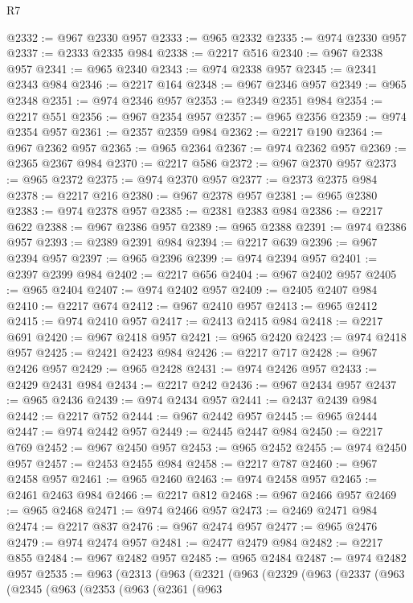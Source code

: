 \begin{lexlean}{R7}
\begin{coremodule}
@2332 := @967 @2330 @957
@2333 := @965 @2332
@2335 := @974 @2330 @957
@2337 := @2333 @2335 @984
@2338 := @2217 @516
@2340 := @967 @2338 @957
@2341 := @965 @2340
@2343 := @974 @2338 @957
@2345 := @2341 @2343 @984
@2346 := @2217 @164
@2348 := @967 @2346 @957
@2349 := @965 @2348
@2351 := @974 @2346 @957
@2353 := @2349 @2351 @984
@2354 := @2217 @551
@2356 := @967 @2354 @957
@2357 := @965 @2356
@2359 := @974 @2354 @957
@2361 := @2357 @2359 @984
@2362 := @2217 @190
@2364 := @967 @2362 @957
@2365 := @965 @2364
@2367 := @974 @2362 @957
@2369 := @2365 @2367 @984
@2370 := @2217 @586
@2372 := @967 @2370 @957
@2373 := @965 @2372
@2375 := @974 @2370 @957
@2377 := @2373 @2375 @984
@2378 := @2217 @216
@2380 := @967 @2378 @957
@2381 := @965 @2380
@2383 := @974 @2378 @957
@2385 := @2381 @2383 @984
@2386 := @2217 @622
@2388 := @967 @2386 @957
@2389 := @965 @2388
@2391 := @974 @2386 @957
@2393 := @2389 @2391 @984
@2394 := @2217 @639
@2396 := @967 @2394 @957
@2397 := @965 @2396
@2399 := @974 @2394 @957
@2401 := @2397 @2399 @984
@2402 := @2217 @656
@2404 := @967 @2402 @957
@2405 := @965 @2404
@2407 := @974 @2402 @957
@2409 := @2405 @2407 @984
@2410 := @2217 @674
@2412 := @967 @2410 @957
@2413 := @965 @2412
@2415 := @974 @2410 @957
@2417 := @2413 @2415 @984
@2418 := @2217 @691
@2420 := @967 @2418 @957
@2421 := @965 @2420
@2423 := @974 @2418 @957
@2425 := @2421 @2423 @984
@2426 := @2217 @717
@2428 := @967 @2426 @957
@2429 := @965 @2428
@2431 := @974 @2426 @957
@2433 := @2429 @2431 @984
@2434 := @2217 @242
@2436 := @967 @2434 @957
@2437 := @965 @2436
@2439 := @974 @2434 @957
@2441 := @2437 @2439 @984
@2442 := @2217 @752
@2444 := @967 @2442 @957
@2445 := @965 @2444
@2447 := @974 @2442 @957
@2449 := @2445 @2447 @984
@2450 := @2217 @769
@2452 := @967 @2450 @957
@2453 := @965 @2452
@2455 := @974 @2450 @957
@2457 := @2453 @2455 @984
@2458 := @2217 @787
@2460 := @967 @2458 @957
@2461 := @965 @2460
@2463 := @974 @2458 @957
@2465 := @2461 @2463 @984
@2466 := @2217 @812
@2468 := @967 @2466 @957
@2469 := @965 @2468
@2471 := @974 @2466 @957
@2473 := @2469 @2471 @984
@2474 := @2217 @837
@2476 := @967 @2474 @957
@2477 := @965 @2476
@2479 := @974 @2474 @957
@2481 := @2477 @2479 @984
@2482 := @2217 @855
@2484 := @967 @2482 @957
@2485 := @965 @2484
@2487 := @974 @2482 @957
@2535 := @963
    (@2313
      (@963
        (@2321
          (@963
            (@2329
              (@963
                (@2337
                  (@963
                    (@2345
                      (@963
                        (@2353
                          (@963
                            (@2361
                              (@963

\end{coremodule}
\end{lexlean}
